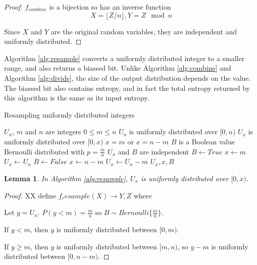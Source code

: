 \documentclass[12pt]{article}
\newtheorem{lemma}{Lemma}
\begin{document}
\begin{proof} $f_{combine}$ is a bijection so has an inverse function 
\begin{equation}    
X = \lfloor Z/n \rfloor, Y = Z \mod n
\end{equation}

Since $X$ and $Y$ are the original random variables, they are independent and uniformly distributed.
\end{proof}

Algorithm \ref{alg:resample} converts a uniformly distributed integer to a smaller range, and also returns a biassed bit. Unlike Algorithm \ref{alg:combine} and Algorithm \ref{alg:divide}, the size of the output distribution depends on the value. The biassed bit also contains entropy, and in fact the total entropy returned by this algorithm is the same as its input entropy.

\begin{algorithm}
\caption{Resampling uniformly distributed integers}
\label{alg:resample}
\begin{algorithmic}[1]
    \Require $U_{n}$, $m$ and $n$ are integers 
    \Require $0 \le m \le n$
    \Require $U_{n}$ is uniformly distributed over $[0,n)$
\Ensure $U_{x}$ is uniformly distributed over $[0,x)$
\Ensure $x = m$ or $x=n-m$
\Ensure $B$ is a Boolean value Bernoulli distributed with $p=\frac{m}{n}$
\Ensure $U_x$ and $B$ are independent
    \State $B \gets True$  
    \State $x \gets m$
    \State $U_x \gets U_n$
  \Else
    \State $B \gets False$  
    \State $x \gets n-m$
    \State $U_x \gets U_n-m$
  \EndIf
  \State \Return $U_x, x, B$
\EndProcedure
\end{algorithmic}
\end{algorithm}

\begin{lemma}
In Algorithm \ref{alg:resample}, $U_x$ is uniformly distributed over $[0,x)$.
\label{lem:resample}
\end{lemma}

\begin{proof}
    XX define $f_resample(X) \rightarrow Y, Z$ where

    Let $y = U_n$.
    $P(y<m) = \frac{m}{n}$ so $B \sim Bernoulli\{\frac{m}{n}\}$.

If $y < m$, then $y$ is uniformly distributed between $[0,m)$.

If $y \ge m$, then $y$ is uniformly distributed between $[m, n)$, so $y-m$ is uniformly distributed between $[0, n-m)$.
\end{proof}
\end{document}
